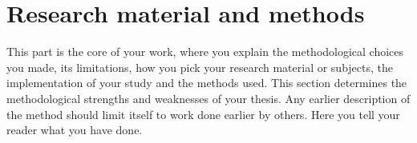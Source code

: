 \section{Research material and methods}

This part is the core of your work, where you explain the methodological choices
you made, its limitations, how you pick your research material or subjects, the 
implementation of your study and the methods used. This section determines the 
methodological strengths and weaknesses of your thesis. Any earlier description 
of the method should limit itself to work done earlier by others. Here you tell 
your reader what you have done.

\clearpage